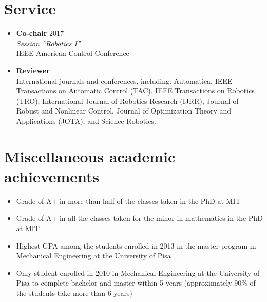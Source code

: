 \documentclass[11pt,a4paper,sans]{moderncv}
\begin{document}
\section{Service}

\vspace{5pt}

\begin{itemize}

\item \textbf{Co-chair} \hfill 2017 \\
\textit{Session ``Robotics I''} \\
IEEE American Control Conference

\item \textbf{Reviewer} \\
International journals and conferences, including:
Automatica,
IEEE Transactions on Automatic Control (TAC),
IEEE Transactions on Robotics (TRO),
International Journal of Robotics Research (IJRR),
Journal of Robust and Nonlinear Control,
Journal of Optimization Theory and Applications (JOTA), and
Science Robotics.

\end{itemize}

\section{Miscellaneous academic achievements}

\vspace{5pt}

\begin{itemize}

\item Grade of A$+$ in more than half of the classes taken in the PhD at MIT

\item Grade of A$+$ in all the classes taken for the minor in mathematics in the PhD at MIT

\item Highest GPA among the students enrolled in 2013 in the master program in Mechanical Engineering at the University of Pisa

\item Only student enrolled in 2010 in Mechanical Engineering at the University of Pisa to complete bachelor and master within 5 years (approximately 90\% of the students take more than 6 years)

\end{itemize}

\end{document}
